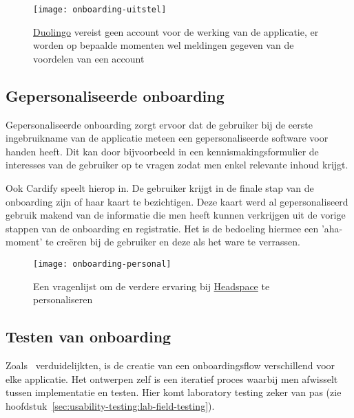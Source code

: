 \begin{figure}[h!]
    \centering
    \texttt{[image: onboarding-uitstel]}
    \caption[Voorbeeld uitgestelde accountcreatie]{\href{https://www.duolingo.com/}{Duolingo} vereist geen account voor de werking van de applicatie, er worden op bepaalde momenten wel meldingen gegeven van de voordelen van een account}
    \label{fig:onboarding:uitgestelde-accountcreatie}
\end{figure}

\subsection{Gepersonaliseerde onboarding}
\label{sec:onboarding:gepersonaliseerd}

Gepersonaliseerde onboarding zorgt ervoor dat de gebruiker bij de eerste ingebruikname van de applicatie meteen een gepersonaliseerde software voor handen heeft. Dit kan door bijvoorbeeld in een kennismakingsformulier de interesses van de gebruiker op te vragen zodat men enkel relevante inhoud krijgt.

Ook Cardify speelt hierop in. De gebruiker krijgt in de finale stap van de onboarding zijn of haar kaart te bezichtigen. Deze kaart werd al gepersonaliseerd gebruik makend van de informatie die men heeft kunnen verkrijgen uit de vorige stappen van de onboarding en registratie. Het is de bedoeling hiermee een 'aha-moment' te creëren bij de gebruiker en deze als het ware te verrassen.

\begin{figure}[h!]
    \centering
    \texttt{[image: onboarding-personal]}
    \caption[Voorbeeld gepersonaliseerde onboarding]{Een vragenlijst om de verdere ervaring bij \href{https://www.headspace.com/}{Headspace} te personaliseren}
    \label{fig:onboarding:gepersonaliseerd}
\end{figure}

\subsection{Testen van onboarding}
\label{sec:onboarding:testen}

Zoals~\textcite{Strahm2018} verduidelijkten, is de creatie van een onboardingsflow verschillend voor elke applicatie. Het ontwerpen zelf is een iteratief proces waarbij men afwisselt tussen implementatie en testen. Hier komt laboratory testing zeker van pas (zie hoofdstuk~\ref{sec:usability-testing:lab-field-testing}).

